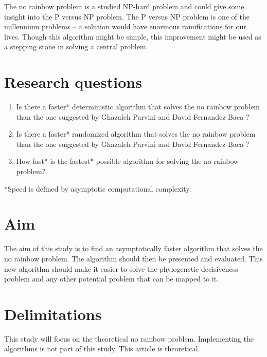 \documentclass[msc,lith,english]{liuthesis}
\begin{document}
The no rainbow problem is a studied NP-hard problem and could give some insight into the P versus NP problem.
The P versus NP problem is one of the millennium problems -- a solution would have enormous ramifications for our lives.
Though this algorithm might be simple, this improvement might be used as a
stepping stone in solving a central problem.


\section{Research questions}
\begin{enumerate}
  \item Is there a faster* deterministic algorithm that solves the no rainbow problem than the one suggested by Ghazaleh Parvini and David Fernandez-Baca \cite{sourceNoRainbow}?
  \item Is there a faster* randomized algorithm that solves the no rainbow problem than the one suggested by Ghazaleh Parvini and David Fernandez-Baca \cite{sourceNoRainbow}?
  \item How fast* is the fastest* possible algorithm for solving the no rainbow problem? 
\end{enumerate}
*Speed is defined by asymptotic computational complexity.

\section{Aim}
The aim of this study is to find an asymptotically faster algorithm that solves
the no rainbow problem. The algorithm should then be presented and evaluated.
This new algorithm should make it easier to solve the phylogenetic decisiveness
problem and any other potential problem that can be mapped to it.

\section{Delimitations}
This study will focus on the theoretical no rainbow problem.
Implementing the algorithms is not part of this study.
This article is theoretical.
\end{document}
